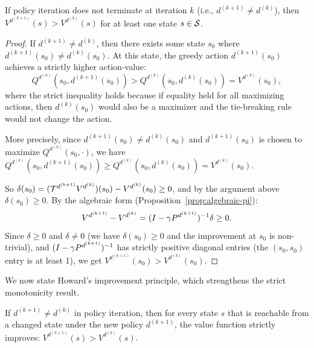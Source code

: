 \documentclass[11pt,a4paper]{article}
\begin{document}
\begin{theorem}
\label{thm:pi-strict-mono}
If policy iteration does not terminate at iteration $k$ (i.e.,
$d^{(k+1)} \neq d^{(k)}$), then
$V^{d^{(k+1)}}(s) > V^{d^{(k)}}(s)$ for at least one state
$s \in \mathcal{S}$.
\end{theorem}

\begin{proof}
If $d^{(k+1)} \neq d^{(k)}$, then there exists some state $s_0$
where $d^{(k+1)}(s_0) \neq d^{(k)}(s_0)$. At this state, the
greedy action $d^{(k+1)}(s_0)$ achieves a strictly higher
action-value:
\[
    Q^{d^{(k)}}(s_0, d^{(k+1)}(s_0))
    > Q^{d^{(k)}}(s_0, d^{(k)}(s_0)) = V^{d^{(k)}}(s_0),
\]
where the strict inequality holds because if equality held for all
maximizing actions, then $d^{(k)}(s_0)$ would also be a maximizer
and the tie-breaking rule would not change the action.

More precisely, since $d^{(k+1)}(s_0) \neq d^{(k)}(s_0)$ and
$d^{(k+1)}(s_0)$ is chosen to maximize $Q^{d^{(k)}}(s_0, \cdot)$,
we have
$Q^{d^{(k)}}(s_0, d^{(k+1)}(s_0)) \geq Q^{d^{(k)}}(s_0,
d^{(k)}(s_0)) = V^{d^{(k)}}(s_0)$.

So $\delta(s_0) = (\mathcal{T}^{d^{(k+1)}} V^{d^{(k)}})(s_0) -
V^{d^{(k)}}(s_0) \geq 0$, and by the argument above
$\delta(s_0) \geq 0$. By the algebraic form
(Proposition~\ref{prop:algebraic-pi}):
\[
    V^{d^{(k+1)}} - V^{d^{(k)}} =
    (I - \gamma P^{d^{(k+1)}})^{-1} \delta \geq 0.
\]
Since $\delta \geq 0$ and $\delta \neq 0$ (we have
$\delta(s_0) \geq 0$ and the improvement at $s_0$ is non-trivial),
and $(I - \gamma P^{d^{(k+1)}})^{-1}$ has strictly positive
diagonal entries (the $(s_0, s_0)$ entry is at least 1), we get
$V^{d^{(k+1)}}(s_0) > V^{d^{(k)}}(s_0)$.
\end{proof}

We now state Howard's improvement principle, which strengthens the
strict monotonicity result.

\begin{theorem}
\label{thm:howard-strict}
If $d^{(k+1)} \neq d^{(k)}$ in policy iteration, then for every
state $s$ that is reachable from a changed state under the new
policy $d^{(k+1)}$, the value function strictly improves:
$V^{d^{(k+1)}}(s) > V^{d^{(k)}}(s)$.
\end{theorem}
\end{document}
